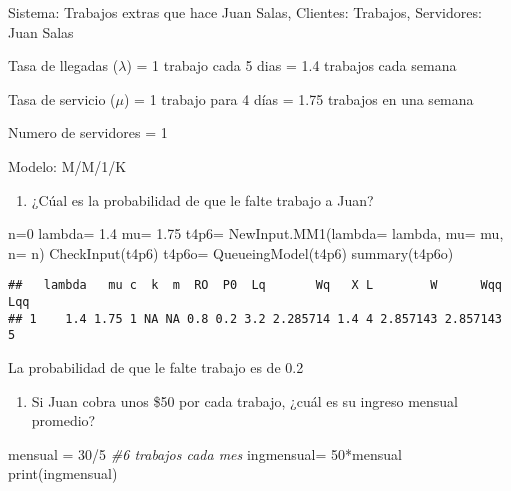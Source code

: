 \documentclass[
]{article}
\newenvironment{Shaded}{\begin{snugshade}}{\end{snugshade}}
\newcommand{\AttributeTok}[1]{\textcolor[rgb]{0.77,0.63,0.00}{#1}}
\newcommand{\CommentTok}[1]{\textcolor[rgb]{0.56,0.35,0.01}{\textit{#1}}}
\newcommand{\DecValTok}[1]{\textcolor[rgb]{0.00,0.00,0.81}{#1}}
\newcommand{\FloatTok}[1]{\textcolor[rgb]{0.00,0.00,0.81}{#1}}
\newcommand{\FunctionTok}[1]{\textcolor[rgb]{0.00,0.00,0.00}{#1}}
\newcommand{\NormalTok}[1]{#1}
\newcommand{\OtherTok}[1]{\textcolor[rgb]{0.56,0.35,0.01}{#1}}
\newcommand{\SpecialCharTok}[1]{\textcolor[rgb]{0.00,0.00,0.00}{#1}}
\providecommand{\tightlist}{%
  \setlength{\itemsep}{0pt}\setlength{\parskip}{0pt}}
\begin{document}
Sistema: Trabajos extras que hace Juan Salas, Clientes: Trabajos,
Servidores: Juan Salas

Tasa de llegadas (\(\lambda\)) = 1 trabajo cada 5 dias = 1.4 trabajos
cada semana

Tasa de servicio (\(\mu\)) = 1 trabajo para 4 días = 1.75 trabajos en
una semana

Numero de servidores = 1

Modelo: M/M/1/K

\begin{enumerate}
\def\labelenumi{\alph{enumi})}
\tightlist
\item
  ¿Cúal es la probabilidad de que le falte trabajo a Juan?
\end{enumerate}

\begin{Shaded}
\begin{Highlighting}[]
\NormalTok{n}\OtherTok{=}\DecValTok{0}
\NormalTok{lambda}\OtherTok{=} \FloatTok{1.4}
\NormalTok{mu}\OtherTok{=} \FloatTok{1.75}
\NormalTok{t4p6}\OtherTok{=} \FunctionTok{NewInput.MM1}\NormalTok{(}\AttributeTok{lambda=}\NormalTok{ lambda, }\AttributeTok{mu=}\NormalTok{ mu, }\AttributeTok{n=}\NormalTok{ n)}
\FunctionTok{CheckInput}\NormalTok{(t4p6)}
\NormalTok{t4p6o}\OtherTok{=} \FunctionTok{QueueingModel}\NormalTok{(t4p6)}
\FunctionTok{summary}\NormalTok{(t4p6o)}
\end{Highlighting}
\end{Shaded}

\begin{verbatim}
##   lambda   mu c  k  m  RO  P0  Lq       Wq   X L        W      Wqq Lqq
## 1    1.4 1.75 1 NA NA 0.8 0.2 3.2 2.285714 1.4 4 2.857143 2.857143   5
\end{verbatim}

La probabilidad de que le falte trabajo es de 0.2

\begin{enumerate}
\def\labelenumi{\alph{enumi})}
\setcounter{enumi}{1}
\tightlist
\item
  Si Juan cobra unos \$50 por cada trabajo, ¿cuál es su ingreso mensual
  promedio?
\end{enumerate}

\begin{Shaded}
\begin{Highlighting}[]
\NormalTok{mensual }\OtherTok{=} \DecValTok{30}\SpecialCharTok{/}\DecValTok{5} \CommentTok{\#6 trabajos cada mes}
\NormalTok{ingmensual}\OtherTok{=} \DecValTok{50}\SpecialCharTok{*}\NormalTok{mensual}
\FunctionTok{print}\NormalTok{(ingmensual)}
\end{Highlighting}
\end{Shaded}
\end{document}
